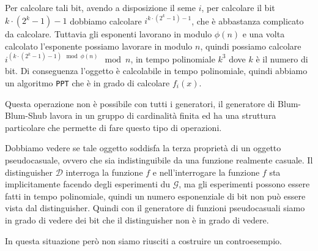 \begin{figure}[H]
  \centering
\end{figure}

Per calcolare tali bit, avendo a disposizione il seme $i$, per 
calcolare il bit $k \cdot (2^k - 1) - 1$ dobbiamo calcolare
$i^{k \cdot (2^k - 1) - 1}$, che è abbastanza complicato da calcolare.
Tuttavia gli esponenti lavorano in modulo $\phi(n)$ e una volta 
calcolato l'esponente possiamo lavorare in modulo $n$, quindi
possiamo calcolare $i^{(k \cdot (2^k - 1) - 1)\mod \phi(n)} \mod n$,
in tempo polinomiale $k^3$ dove $k$ è il numero di bit.
Di conseguenza l'oggetto è calcolabile in tempo polinomiale,
quindi abbiamo un algoritmo \texttt{PPT} che è in grado di calcolare 
$f_i(x)$.

Questa operazione non è possibile con tutti i generatori, il 
generatore di Blum-Blum-Shub lavora in un gruppo di cardinalità 
finita ed ha una struttura particolare che permette di fare
questo tipo di operazioni.

Dobbiamo vedere se tale oggetto soddisfa la terza proprietà di un 
oggetto pseudocasuale, ovvero che sia indistinguibile da una funzione
realmente casuale. Il distinguisher $\mathcal{D}$ interroga 
la funzione $f$ e nell'interrogare la funzione $f$ sta implicitamente 
facendo degli esperimenti du $\mathcal{G}$, ma gli esperimenti possono essere 
fatti in tempo polinomiale, quindi un numero esponenziale di bit non 
può essere vista dal distinguisher. Quindi con il generatore di funzioni 
pseudocasuali siamo in grado di vedere dei bit che il distinguisher non è 
in grado di vedere.

In questa situazione però non siamo riusciti a costruire un controesempio.

